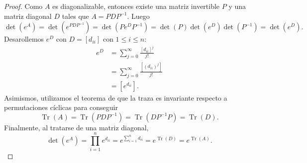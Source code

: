 \documentclass{article}
\theoremstyle{definition}
\theoremstyle{remark}
\DeclareMathOperator{\Tr}{Tr}
\begin{document}
\begin{proof}
  Como $A$ es diagonalizable, entonces existe una matriz invertible $P$ y una
  matriz diagonal $D$ tales que $A = P D P^{-1}$. Luego
  \[
    \det(e^A) = \det(e^{P D P^{-1}}) = \det(P e^D P^{-1}) =
    \det(P) \det(e^D) \det(P^{-1}) = \det(e^D).
  \]
  Desarollemos $e^D$ con $D = [d_{i i}]$ con $1 \leq i \leq n$:
  \begin{align*}
    e^D &= \sum_{j = 0} ^ {\infty} \frac{[d_{i i}] ^ j}{j!} \\
    &= \sum_{j = 0} ^ {\infty} \frac{[(d_{i i})^j]}{j!} \\
    &= [e^{d_{i i}}].
  \end{align*}
  Asimismos, utilizamos el teorema de que la traza es invariante respecto a
  permutaciones c\'iclicas para conseguir
  \[
    \Tr(A) = \Tr(P D P^{-1}) = \Tr(D P^{-1} P) = \Tr(D).
  \]
  Finalmente, al tratarse de una matriz diagonal,
  \[
    \det(e^A) = \prod_{i = 1} ^ n e^{d_{i i}}  =
    e^{\sum_{i = 1} ^ n d_{i i}} = e^{\Tr(D)} = e^{\Tr(A)}.
  \]
\end{proof}
\end{document}
